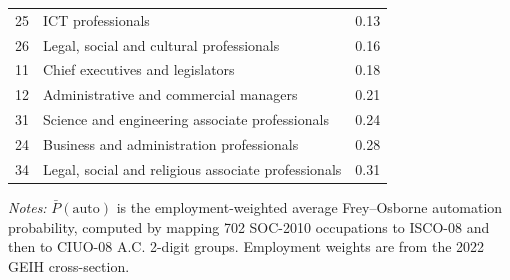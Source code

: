\documentclass[5p,times,authoryear]{elsarticle}
\begin{document}
\begin{table}[htbp]
\begin{threeparttable}
\begin{tabular}{@{}clc@{}}
25 & ICT professionals & 0.13 \\
26 & Legal, social and cultural professionals & 0.16 \\
11 & Chief executives and legislators & 0.18 \\
12 & Administrative and commercial managers & 0.21 \\
31 & Science and engineering associate professionals & 0.24 \\
24 & Business and administration professionals & 0.28 \\
34 & Legal, social and religious associate professionals & 0.31 \\
\bottomrule
\end{tabular}
\begin{tablenotes}
\footnotesize
\item \textit{Notes:} $\bar{P}(\text{auto})$ is the employment-weighted average Frey--Osborne automation probability, computed by mapping 702 SOC-2010 occupations to ISCO-08 and then to CIUO-08 A.C. 2-digit groups. Employment weights are from the 2022 GEIH cross-section.
\end{tablenotes}
\end{threeparttable}
\end{table}
\end{document}
